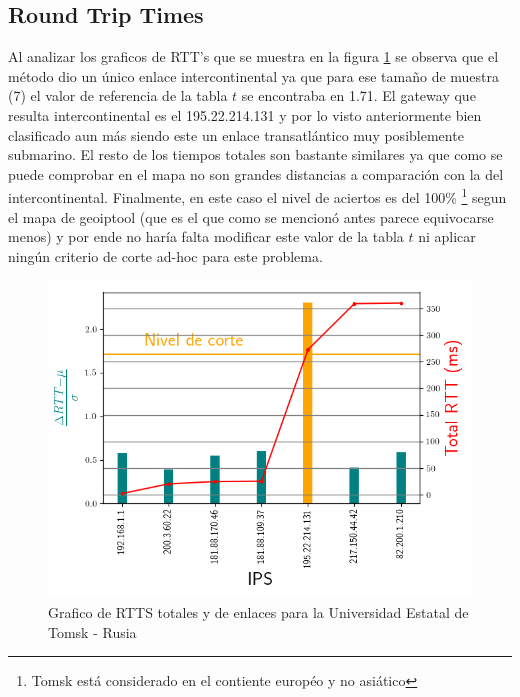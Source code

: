 \subsection{Round Trip Times}

Al analizar los graficos de RTT's que se muestra en la figura
\ref{fig:rtts_tsu} se observa que el método dio un único enlace
intercontinental ya que para ese tamaño de muestra (7) el valor de referencia
de la tabla $t$ se encontraba en 1.71. El gateway que resulta intercontinental
es el 195.22.214.131 y por lo visto anteriormente bien clasificado aun más
siendo este un enlace transatlántico muy posiblemente submarino. El resto de los
tiempos totales son bastante similares ya que como se puede comprobar en el mapa
no son grandes distancias a comparación con la del intercontinental. Finalmente, 
en este caso el nivel de aciertos es del 100\% \footnote{Tomsk está considerado
en el contiente européo y no asiático} segun el mapa de geoiptool (que es el que como se mencionó
antes parece equivocarse menos) y por ende no haría falta modificar este valor de
la tabla $t$ ni aplicar ningún criterio de corte ad-hoc para este problema.

\begin{figure}[ht]\label{fig:rtts_tsu}
	\begin{center}
		\includegraphics[width=0.8\columnwidth]{imagenes/rtts_tsu.png}
		\caption{Grafico de RTTS totales y de enlaces para la Universidad Estatal de Tomsk - Rusia}
	\end{center}
\end{figure}
